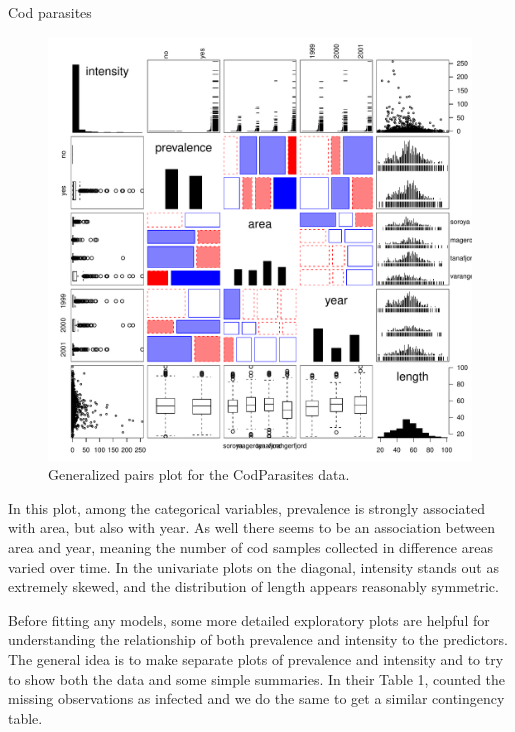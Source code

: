 \documentclass[11pt]{book}\usepackage[]{graphicx}\usepackage[]{color}
\newenvironment{knitrout}{}{} %
\renewenvironment{knitrout}{\small\renewcommand{\baselinestretch}{.85}}{} %
\begin{document}
\begin{Example}[cod1]{Cod parasites}
\begin{knitrout}
\begin{figure}[htb!]
\centerline{\includegraphics[width=.8\textwidth]{ch09/fig/cod1-gpairs-1} }

\caption[Generalized pairs plot for the CodParasites data]{Generalized pairs plot for the CodParasites data.\label{fig:cod1-gpairs}}
\end{figure}


\end{knitrout}
In this plot, among the categorical variables, prevalence is strongly associated with area, but also with year.
As well there seems to be an association between area and year, meaning the number of cod samples
collected in difference areas varied over time. In the univariate plots on the diagonal, intensity
stands out as extremely skewed, and the distribution of length appears reasonably symmetric.

Before fitting any models, some more detailed
exploratory plots are helpful for understanding the relationship
of both prevalence and intensity to the predictors.  The general idea is to make separate
plots of prevalence and intensity and to try to show both the data and some simple summaries.
In their Table 1, \citet{Hemmingsen-etal:2005}
counted the missing observations as infected and we do the same to get a similar contingency table.


\end{Example}
\end{document}
